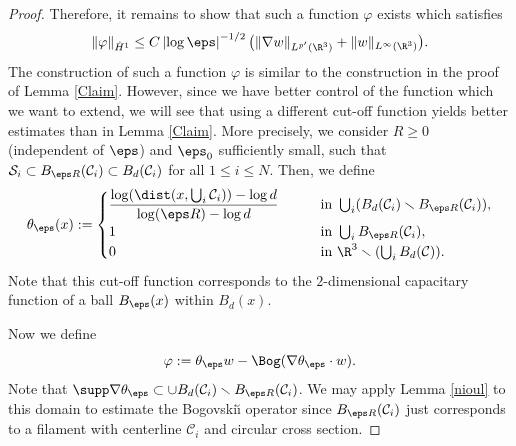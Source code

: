\begin{proof}
Therefore, it remains to show that such a function $\varphi$ exists which satisfies
\begin{equation} \label{est:varphi}
\|\varphi\|_{\dot H^1} \leq C \left|\log \eps\right|^{-1/2} \bigl(\|\nabla w\|_{L^{p'}(\R^3)} + \|w\|_{L^\infty(\R^3)} \bigr).
\end{equation}
The construction of such a function $\varphi$ is similar to the construction in the proof of Lemma \ref{Claim}. However, since we have better control of the function which we want to extend,
we will see that using a different cut-off function yields better estimates than in Lemma \ref{Claim}.
More precisely, we consider $R\geq 0$ (independent of $\eps$) and $\eps_0$ sufficiently small, such that $\mathcal S_i \subset B_{\eps R}(\mathcal C_i) \subset B_d(\mathcal C_i)$ for all $1 \leq i \leq N$.
Then, we define
\begin{equation}
\theta_\eps (x) := \begin{cases}
\dfrac{\log(\dist(x, \bigcup_i \mathcal C_i)) - \log d}{\log (\eps R) - \log d} & \qquad \text{in } \bigcup_i(B_d(\mathcal C_i) \smallsetminus B_{\eps R}(\mathcal C_i)), \\
1 & \qquad \text{in } \bigcup_i B_{\eps R}(\mathcal C_i), \\
0 & \qquad \text{in } \R^3 \smallsetminus(\bigcup_i B_d(\mathcal C)).
\end{cases}
\end{equation}
Note that this cut-off function corresponds to the $2$-dimensional capacitary function of a ball $B_\eps(x)$ within $B_d(x)$.

Now we define
\begin{equation}
\varphi := \theta_\eps w - \Bog(\nabla \theta_\eps \cdot w).
\end{equation}
Note that $\supp \nabla \theta_\eps \subset \cup B_d(\mathcal C_i) \smallsetminus B_{\eps R}(\mathcal C_i)$. We may apply Lemma \ref{nioul} to this domain to estimate the Bogovski\u{\i} operator since $B_{\eps R}(\mathcal C_i)$ just corresponds to a filament with centerline $\mathcal C_i$ and circular cross section.


\end{proof}
